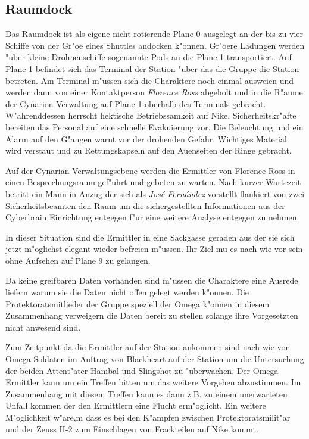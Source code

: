 \subsection{Raumdock}
Das Raumdock ist als eigene nicht rotierende Plane 0 ausgelegt an der bis zu vier Schiffe von der Gr"o\3e eines Shuttles andocken k"onnen. Gr"o\3ere Ladungen werden "uber kleine Drohnenschiffe sogenannte Pods an die Plane 1 transportiert. Auf Plane 1 befindet sich das Terminal der Station "uber das die Gruppe die Station betreten. Am Terminal m"ussen sich die Charaktere noch einmal auswei\3en und werden dann von einer Kontaktperson \emph{Florence Ross} abgeholt und in die R"aume der Cynarion Verwaltung auf Plane 1 oberhalb des Terminals gebracht. W"ahrenddessen herrscht hektische Betriebssamkeit auf Nike. Sicherheitskr"afte bereiten das Personal auf eine schnelle Evakuierung vor. Die Beleuchtung und ein Alarm auf den G"angen warnt vor der drohenden Gefahr. Wichtiges Material wird verstaut und zu Rettungskapseln auf den Au\3enseiten der Ringe gebracht.

Auf der Cynarian Verwaltungsebene werden die Ermittler von Florence Ross in einen Besprechungsraum gef"uhrt und gebeten zu warten. Nach kurzer Wartezeit betritt ein Mann in Anzug der sich als \emph{Jos\'e Fern\'andez} vorstellt flankiert von zwei Sicherheitsbeamten den Raum
um die sichergestellten Informationen aus der Cyberbrain Einrichtung entgegen f"ur eine weitere Analyse entgegen zu nehmen. 

\begin{remarks}
	In dieser Situation sind die Ermittler in eine Sackgasse geraden aus der sie sich jetzt m"oglichst elegant wieder befreien m"ussen. Ihr Ziel mu\3 es nach wie vor sein ohne Aufsehen auf Plane 9 zu gelangen. 

	Da keine greifbaren Daten vorhanden sind m"ussen die Charaktere eine Ausrede liefern warum sie die Daten nicht offen gelegt werden k"onnen. Die Protektoratsmitlieder der Gruppe speziell der Omega k"onnen in diesem Zusammenhang verweigern die Daten bereit zu stellen solange ihre Vorgesetzten nicht anwesend sind.

	Zum Zeitpunkt da die Ermittler auf der Station ankommen sind nach wie vor Omega Soldaten im Auftrag von Blackheart auf der Station um die Untersuchung der beiden Attent"ater Hanibal und Slingshot zu "uberwachen. Der Omega Ermittler kann um ein Treffen bitten um das weitere Vorgehen abzustimmen. Im Zusammenhang mit diesem Treffen kann es dann z.B. zu einem unerwarteten Unfall kommen der den Ermittlern eine Flucht erm"oglicht. Ein weitere M"oglichkeit w"are,m dass es bei den K"ampfen zwischen Protektoratsmilit"ar und der Zeuss II-2 zum Einschlagen von Frackteilen auf Nike kommt.
\end{remarks}

